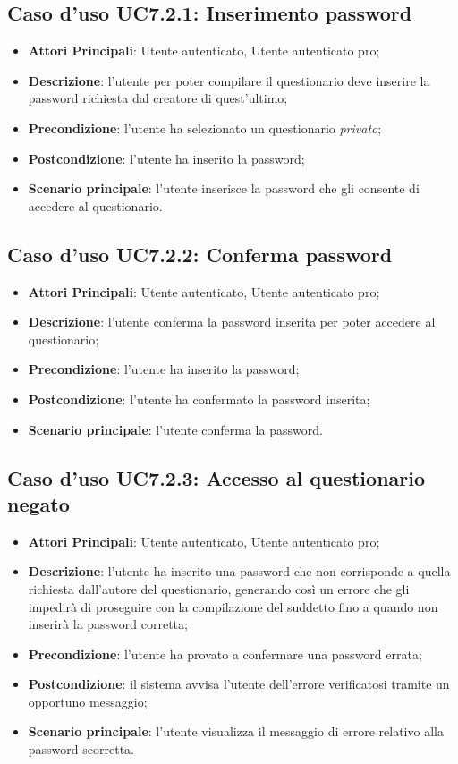 \subsection{Caso d'uso UC7.2.1: Inserimento password}
\begin{itemize}
\item\textbf{Attori Principali}: Utente autenticato, Utente autenticato pro;
\item\textbf{Descrizione}: l'utente per poter compilare il questionario deve inserire la password richiesta dal creatore di quest'ultimo;
\item\textbf{Precondizione}: l'utente ha selezionato un questionario \textit{privato};
\item\textbf{Postcondizione}: l'utente ha inserito la password;
\item\textbf{Scenario principale}: l'utente inserisce la password che gli consente di accedere al questionario.
\end{itemize}

\subsection{Caso d'uso UC7.2.2: Conferma password}
\begin{itemize}
\item\textbf{Attori Principali}: Utente autenticato, Utente autenticato pro;
\item\textbf{Descrizione}: l'utente conferma la password inserita per poter accedere al questionario;
\item\textbf{Precondizione}: l'utente ha inserito la password;
\item\textbf{Postcondizione}: l'utente ha confermato la password inserita;
\item\textbf{Scenario principale}: l'utente conferma la password.
\end{itemize}

\subsection{Caso d'uso UC7.2.3: Accesso al questionario negato}
\begin{itemize}
\item\textbf{Attori Principali}: Utente autenticato, Utente autenticato pro;
\item\textbf{Descrizione}: l'utente ha inserito una password che non corrisponde a quella richiesta dall'autore del questionario, generando così un errore che gli impedirà di proseguire con la compilazione del suddetto fino a quando non inserirà la password corretta;
\item\textbf{Precondizione}: l'utente ha provato a confermare una password errata;
\item\textbf{Postcondizione}: il sistema avvisa l'utente dell'errore verificatosi tramite un opportuno messaggio;
\item\textbf{Scenario principale}: l'utente visualizza il messaggio di errore relativo alla password scorretta.
\end{itemize}

